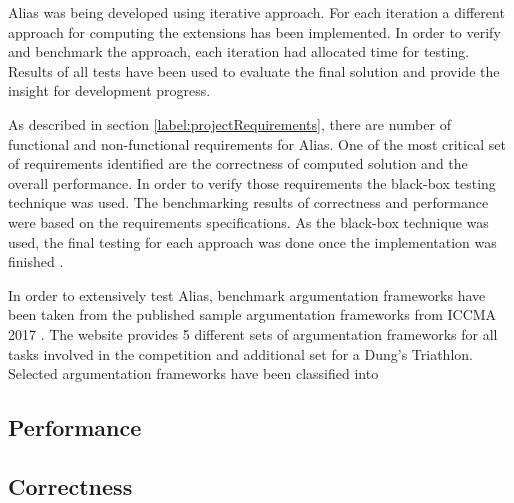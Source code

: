 Alias was being developed using iterative approach. For each iteration a different approach for computing the extensions has been implemented. In order to verify and benchmark the approach, each iteration had allocated time for testing. Results of all tests have been used to evaluate the final solution and provide the insight for development progress.

As described in section \ref{label:projectRequirements}, there are number of functional and non-functional requirements for Alias. One of the most critical set of requirements identified are the correctness of computed solution and the overall performance. In order to verify those requirements the black-box testing technique was used. The benchmarking results of correctness and performance were based on the requirements specifications. As the black-box technique was used, the final testing for each approach was done once the implementation was finished \citep{blackbox}.

In order to extensively test Alias, benchmark argumentation frameworks have been taken from the published sample argumentation frameworks from ICCMA 2017 \citep{iccmaResults}. The website provides 5 different sets of argumentation frameworks for all tasks involved in the competition and additional set for a Dung's Triathlon. Selected argumentation frameworks have been classified into 

\subsection{Performance}



\subsection{Correctness}